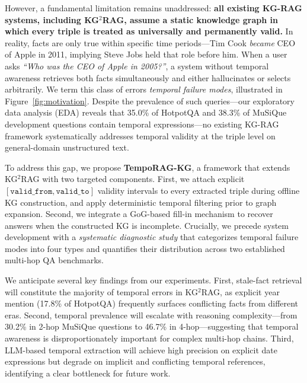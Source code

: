 \documentclass[11pt]{article}
\begin{document}
However, a fundamental limitation remains unaddressed: \textbf{all existing
KG-RAG systems, including KG$^2$RAG, assume a static knowledge graph in
which every triple is treated as universally and permanently valid.} In
reality, facts are only true within specific time periods---Tim Cook
\textit{became} CEO of Apple in 2011, implying Steve Jobs held that role
before him. When a user asks \textit{``Who was the CEO of Apple in 2005?''},
a system without temporal awareness retrieves both facts simultaneously and
either hallucinates or selects arbitrarily. We term this class of errors
\textit{temporal failure modes}, illustrated in Figure~\ref{fig:motivation}.
Despite the prevalence of such queries---our exploratory data analysis (EDA)
reveals that 35.0\% of HotpotQA and 38.3\% of MuSiQue development questions
contain temporal expressions---no existing KG-RAG framework systematically
addresses temporal validity at the triple level on general-domain unstructured
text.

To address this gap, we propose \textbf{TempoRAG-KG}, a framework that
extends KG$^2$RAG with two targeted components. First, we attach explicit
$[\mathtt{valid\_from}, \mathtt{valid\_to}]$ validity intervals to every
extracted triple during offline KG construction, and apply deterministic
temporal filtering prior to graph expansion. Second, we integrate a
GoG-based fill-in mechanism \cite{he2024gog} to recover answers when the
constructed KG is incomplete. Crucially, we precede system development
with a \textit{systematic diagnostic study} that categorizes temporal
failure modes into four types and quantifies their distribution across
two established multi-hop QA benchmarks.

We anticipate several key findings from our experiments. First, stale-fact
retrieval will constitute the majority of temporal errors in KG$^2$RAG,
as explicit year mention (17.8\% of HotpotQA) frequently surfaces
conflicting facts from different eras. Second, temporal prevalence will
escalate with reasoning complexity---from 30.2\% in 2-hop MuSiQue questions
to 46.7\% in 4-hop---suggesting that temporal awareness is disproportionately
important for complex multi-hop chains. Third, LLM-based temporal extraction
will achieve high precision on explicit date expressions but degrade on
implicit and conflicting temporal references, identifying a clear bottleneck
for future work.
\end{document}
